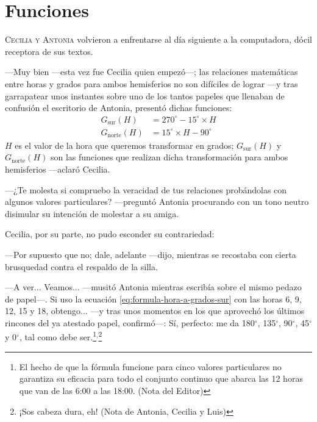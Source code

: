 \chapter{Funciones}

\lettrine[lines=2]{C}{ecilia y Antonia} volvieron a enfrentarse al día
siguiente a la computadora, dócil receptora de sus textos.

---Muy bien ---esta vez fue Cecilia quien empezó---; las relaciones
matemáticas entre horas y grados para ambos he\-mis\-fe\-rios no son
difíciles de lograr ---y tras garrapatear unos instantes sobre uno de
los tantos papeles que llenaban de confusión el escritorio de Antonia,
presentó dichas funciones:
\begin{subequations}
\begin{align}
      G_{\text{sur}}(H) &= 270^{\circ} - 15^{\circ} \times H \label{eq:formula-hora-a-grados-sur}\\
      G_{\text{norte}}(H) &= 15^{\circ} \times H - 90^{\circ} \label{eq:formula-hora-a-grados-norte}
\end{align}
\end{subequations}
\label{eq:formula-hora-a-grados}
\guillemotright $H$ es el valor de la hora que queremos transformar en
grados; $G_{\text{sur}}(H)$ y $G_{\text{norte}}(H)$ son las funciones
que realizan dicha transformación para ambos hemisferios ---aclaró
Cecilia.

---¿Te molesta si compruebo la veracidad de tus relaciones probándolas
con algunos valores particulares? ---pre\-gun\-tó Antonia procurando con
un tono neutro disimular su intención de molestar a su amiga.

Cecilia, por su parte, no pudo esconder su contrariedad:

---Por supuesto que no; dale, adelante ---dijo, mientras se recostaba
con cierta brusquedad contra el respaldo de la silla.

---A ver... Veamos... ---musitó Antonia mientras escribía sobre el
mismo pedazo de papel---. Si uso la ecuación
\ref{eq:formula-hora-a-grados-sur} con las horas 6, 9, 12, 15 y 18,
obtengo... ---y tras unos momentos en los que aprovechó los últimos
rincones del ya atestado papel, confirmó---: Sí, perfecto: me da
180$^{\circ}$, 135$^{\circ}$, 90$^{\circ}$, 45$^{\circ}$ y
0$^{\circ}$, tal como debe ser.\footnote{El hecho de que la fórmula
  funcione para cinco valores particulares no garantiza su eficacia
  para todo el conjunto continuo que abarca las 12 horas que van de
  las 6:00 a las 18:00. (Nota del Editor)}$^,$\footnote{¡Sos cabeza
  dura, eh! (Nota de Antonia, Cecilia y Luis)}


